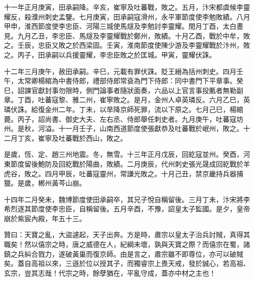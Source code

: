 \begin{pinyinscope}
 十一年正月庚寅，田承嗣降。辛亥，崔寧及吐蕃戰，敗之。五月，汴宋都虞候李靈耀反，殺濮州刺史孟鑒。七月庚寅，田承嗣寇滑州，永平軍節度使李勉敗績。八月甲申，淮西節度使李忠臣、河陽三城使馬燧及李勉討李靈耀。閏月丁酉，太白晝見。九月乙丑，李忠臣、馬燧及李靈耀戰於鄭州，敗績。十月乙酉，戰於中牟，敗之。壬辰，忠臣又敗之於西梁固。壬寅，淮南節度使陳少游及李靈耀戰於汴州，敗之。丙子，田承嗣以兵援靈耀，李忠臣敗之於匡城。甲寅，靈耀伏誅。



 十二年三月庚午，赦田承嗣。辛巳，元載有罪伏誅。貶王縉為括州刺史。四月壬午，太常卿楊綰為中書侍郎，禮部侍郎常袞為門下侍郎：同中書門下平章事。癸巳，詔諫官獻封事勿限時，側門論事者隨狀面奏，六品以上官言事投匭者無勒副章。丁酉，吐蕃寇黎、雅二州，崔寧敗之。是月，金州人卓英璘反。六月乙巳，英璘伏誅。給復金州二年。丁未，以旱降京師死罪，流以下原之。七月己巳，楊綰薨。丙子，詔尚書、御史大夫、左右丞、侍郎舉任刺史者。九月庚午，吐蕃寇坊州。是秋，河溢。十一月壬子，山南西道節度使張獻恭及吐蕃戰於岷州，敗之。十二月丁亥，崔寧及吐蕃戰於西山，敗之。



 是歲，恆、定、趙三州地震。冬，無雪。十三年正月戊辰，回紇寇並州。癸酉，河東節度留後鮑防及回紇戰於陽曲，敗績。二月庚辰，代州刺史張光晟成回紇戰於羊虎谷，敗之。四月甲辰，吐蕃寇靈州，常謙光敗之。十月己丑，禁京畿持兵器捕獵。是歲，郴州黃芩山崩。



 十四年二月癸未，魏博節度使田承嗣卒，其兄子悅自稱留後。三月丁未，汴宋將李希烈逐其節度使李忠臣，自稱留後。五月辛酉，不豫，詔皇太子監國。是夕，皇帝崩於紫宸內殿，年五十三。



 贊曰：天寶之亂，大盜遽起，天子出奔。方是時，肅宗以皇太子治兵討賊，真得其職矣！然以僖宗之時，唐之威德在人，紀綱未壞，孰與天寶之際？而僖宗在蜀，諸鎮之兵糾合戮力，遂破黃巢而復京師。由是言之，肅宗雖不即尊位，亦可以破賊矣。蓋自高祖以來，三遜於位以授其子，而獨睿宗上畏天戒，發於誠心，若高祖、玄宗，豈其志哉！代宗之時，餘孽猶在，平亂守成，蓋亦中材之主也！



\end{pinyinscope}
